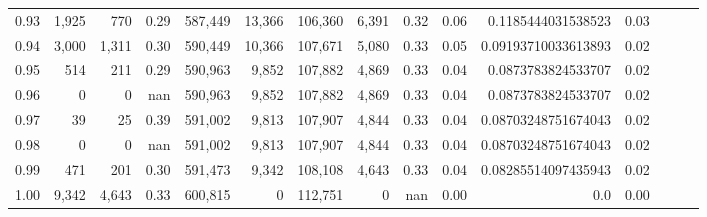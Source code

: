 \begin{tabular}{rrrrrrrrrrrrrrr}
0.93 &   1,925 &    770 &  0.29 &  587,449 &   13,366 &  106,360 &    6,391 &  0.32 &  0.06 &   0.1185444031538523 &      0.03 \\
0.94 &   3,000 &  1,311 &  0.30 &  590,449 &   10,366 &  107,671 &    5,080 &  0.33 &  0.05 &  0.09193710033613893 &      0.02 \\
0.95 &     514 &    211 &  0.29 &  590,963 &    9,852 &  107,882 &    4,869 &  0.33 &  0.04 &   0.0873783824533707 &      0.02 \\
0.96 &       0 &      0 &   nan &  590,963 &    9,852 &  107,882 &    4,869 &  0.33 &  0.04 &   0.0873783824533707 &      0.02 \\
0.97 &      39 &     25 &  0.39 &  591,002 &    9,813 &  107,907 &    4,844 &  0.33 &  0.04 &  0.08703248751674043 &      0.02 \\
0.98 &       0 &      0 &   nan &  591,002 &    9,813 &  107,907 &    4,844 &  0.33 &  0.04 &  0.08703248751674043 &      0.02 \\
0.99 &     471 &    201 &  0.30 &  591,473 &    9,342 &  108,108 &    4,643 &  0.33 &  0.04 &  0.08285514097435943 &      0.02 \\
1.00 &   9,342 &  4,643 &  0.33 &  600,815 &        0 &  112,751 &        0 &   nan &  0.00 &                  0.0 &      0.00 \\
\bottomrule
\end{tabular}
